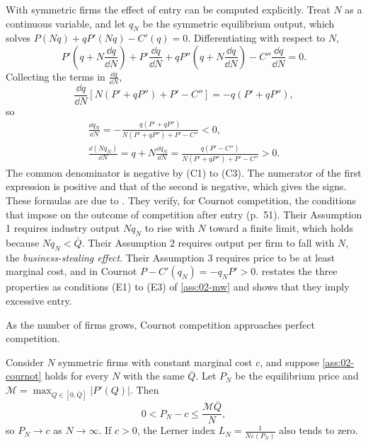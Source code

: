 With symmetric firms the effect of entry can be computed explicitly. Treat $N$ as a continuous variable, and let
$q_N$ be the symmetric equilibrium output, which solves $P(Nq) + qP'(Nq) - C'(q) = 0$. Differentiating with respect
to $N$,
\[
  P'\left(q + N\frac{\dd q}{\dd N}\right) + P'\frac{\dd q}{\dd N} + qP''\left(q + N\frac{\dd q}{\dd N}\right)
  - C''\frac{\dd q}{\dd N} = 0 .
\]
Collecting the terms in $\frac{\dd q}{\dd N}$,
\[
  \frac{\dd q}{\dd N}\left[N(P' + qP'') + P' - C''\right] = -q(P' + qP'') ,
\]
so
\begin{equation}\label{eq:02-seade}
\begin{gathered}
  \frac{\dd q_N}{\dd N} = -\frac{q(P' + qP'')}{N(P' + qP'') + P' - C''} < 0, \\
  \frac{\dd (Nq_N)}{\dd N} = q + N\frac{\dd q_N}{\dd N} = \frac{q(P' - C'')}{N(P' + qP'') + P' - C''} > 0 .
\end{gathered}
\end{equation}
The common denominator is negative by (C1) to (C3). The numerator of the first expression is positive and that of
the second is negative, which gives the signs. These formulas are due to \citet{Seade1980}. They verify, for Cournot
competition, the conditions that \citet{MankiwWhinston1986} impose on the outcome of competition after entry
(p.~51). Their Assumption 1 requires industry output $Nq_N$ to rise with $N$ toward a finite limit, which holds
because $Nq_N < \bar Q$. Their Assumption 2 requires output per firm to fall with $N$, the \emph{business-stealing
effect}. Their Assumption 3 requires price to be at least marginal cost, and in Cournot $P - C'(q_N) = -q_NP' > 0$.
 restates the three properties as conditions (E1) to (E3) of \cref{ass:02-mw} and shows that
they imply excessive entry.

As the number of firms grows, Cournot competition approaches perfect competition.

\begin{proposition}\label{prop:02-cournot-converge}
Consider $N$ symmetric firms with constant marginal cost $c$, and suppose \cref{ass:02-cournot} holds for every $N$
with the same $\bar Q$. Let $P_N$ be the equilibrium price and $\mathcal{M} = \max_{Q \in [0, \bar Q]}\lvert P'(Q)\rvert$.
Then
\[
  0 < P_N - c \le \frac{\mathcal{M}\bar Q}{N},
\]
so $P_N \to c$ as $N \to \infty$. If $c > 0$, the Lerner index $L_N = \frac{1}{N\varepsilon(P_N)}$ also tends to
zero.
\end{proposition}

